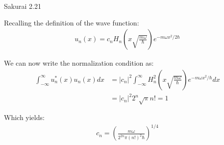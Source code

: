 \documentclass{article}
\begin{document}
\begin{section}{Sakurai 2.21}
\begin{tcolorbox}[breakable]
	Recalling the definition of the wave function:
	\begin{align*}
		u_n(x) = c_n H_n \left(x \sqrt{\frac{m \omega}{\hbar}}\right) e^{-m\omega x^2/2\hbar}
	\end{align*}

	We can now write the normalization condition as:
	\begin{align*}
		\int_{-\infty}^\infty u_n^*(x) u_n(x) dx &= |c_n|^2 \int_{-\infty}^\infty  H_n^2 \left(x \sqrt{\frac{m \omega}{\hbar}}\right)  e^{-m\omega x^2/\hbar} dx \\
		&= |c_n|^2 2^n \sqrt{\pi} n! = 1
	\end{align*}

	Which yields:
	\begin{align*}
		c_n = \left( \frac{m\omega}{2^{2n} \pi (n!)^2 \hbar} \right)^{1/4}
	\end{align*}
\end{tcolorbox}
\end{section}
\end{document}
